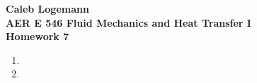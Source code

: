 \documentclass[11pt, oneside]{article}
\begin{document}
\noindent \textbf{\Large{Caleb Logemann \\
AER E 546 Fluid Mechanics and Heat Transfer I \\
Homework 7
}}

%
\begin{enumerate}
  \item %

  \item %

\end{enumerate}
\end{document}
